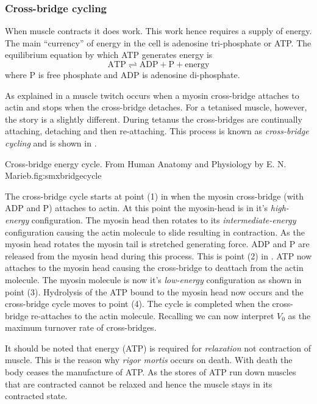 \subsubsection{Cross-bridge cycling}

When muscle contracts it does work. This work hence requires a supply of
energy. The main ``currency'' of energy in the cell is adenosine
tri-phosphate or ATP. The equilibrium equation by which ATP generates energy
is 
\begin{equation}
  \text{ATP} \rightleftharpoons \text{ADP} + \text{P} + \text{energy} 
\end{equation}
where P is free phosphate and ADP is adenosine di-phosphate. 

As explained in  a muscle twitch occurs
when a myosin cross-bridge attaches to actin and stops when the cross-bridge
detaches. For a tetanised muscle, however, the story is a slightly
different. During tetanus the cross-bridges are continually attaching,
detaching and then re-attaching. This process is known as \emph{cross-bridge
  cycling} and is shown in .

{Cross-bridge energy cycle. From Human Anatomy and Physiology by E. N.
  Marieb.}{fig:smxbridgecycle}

The cross-bridge cycle starts at point (1) in  when
the myosin cross-bridge (with ADP and P) attaches to actin. At this point the
myosin-head is in it's \emph{high-energy} configuration. The myosin head then
rotates to its \emph{intermediate-energy} configuration causing the actin
molecule to slide resulting in contraction. As the myosin head rotates the
myosin tail is stretched generating force. ADP and P are released from the
myosin head during this process.  This is point (2) in
.  ATP now attaches to the myosin head causing the
cross-bridge to deattach from the actin molecule.  The myosin molecule is now
it's \emph{low-energy} configuration as shown in point (3). Hydrolysis of the
ATP bound to the myosin head now occurs and the cross-bridge cycle moves to
point (4). The cycle is completed when the cross-bridge re-attaches to the
actin molecule. Recalling  we can now interpret
$V_{0}$ as the maximum turnover rate of cross-bridges.

It should be noted that energy (ATP) is required for \emph{relaxation} not
contraction of muscle. This is the reason why \emph{rigor mortis} occurs on
death. With death the body ceases the manufacture of ATP. As the stores of
ATP run down muscles that are contracted cannot be relaxed and hence the
muscle stays in its contracted state.

